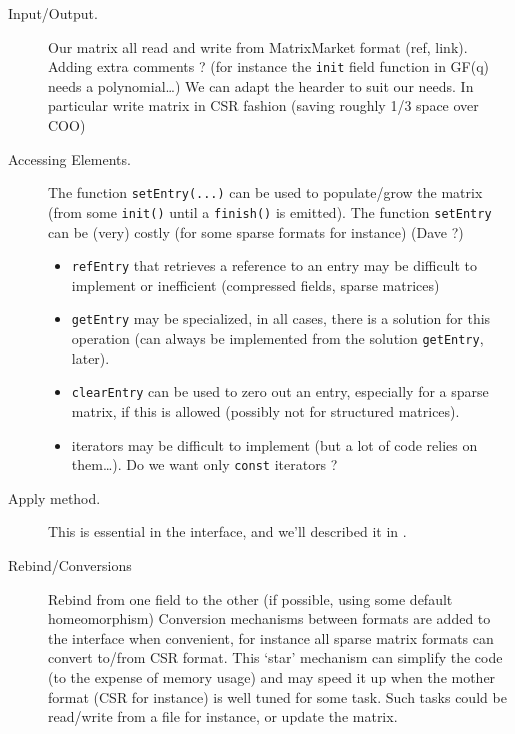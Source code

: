 \begin{description}
%
	\item[Input/Output.] Our matrix all read and write from MatrixMarket
		format (ref, link).  Adding extra comments ? (for instance the
		{\tt init} field function in GF(q) needs a polynomial\ldots) We
		can adapt the hearder to suit our needs. In particular write
		matrix in CSR fashion (saving roughly 1/3 space over COO)
%
	\item[Accessing Elements.] The function \texttt{setEntry(...)} can be
		used to populate/grow the matrix (from some \texttt{init()}
		until a \texttt{finish()} is emitted).  The function
		\texttt{setEntry} can be (very) costly (for some sparse formats
		for instance) (Dave ?)
%
		\begin{itemize}
			\item \texttt{refEntry} that retrieves a reference to
				an entry may be difficult to implement or
				inefficient (compressed fields, sparse
				matrices)
			\item \texttt{getEntry} may be specialized, in all
				cases, there is a solution for this operation
				(can always be implemented from the solution
				\texttt{getEntry}, \cf{} later).
			\item \texttt{clearEntry} can be used to zero out an
				entry, especially for a sparse matrix, if this
				is allowed (possibly not for structured
				matrices).
			\item iterators may be difficult to implement (but a
				lot of code relies on them\ldots). \danger Do we want
				only {\tt const} iterators ?
%
		\end{itemize}
%
	\item[Apply method.]
		This is essential in the \applin interface, and we'll described
		it in .
%
	\item[Rebind/Conversions] Rebind from one field to the other (if
		possible, using some default homeomorphism)
%
	 Conversion mechanisms between formats are added to the interface when
	 convenient, for instance all sparse matrix formats can convert to/from
	 CSR format.  This `star' mechanism can simplify the code (to the
	 expense of memory usage) and may speed it up when the mother format
	 (CSR for instance) is well tuned for some task. Such tasks could be
	 read/write from a file for instance, or update the matrix.
%
\end{description}
%

